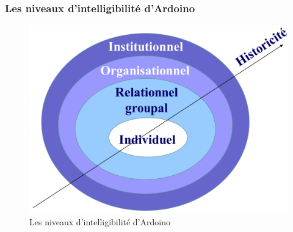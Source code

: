 \documentclass[12pt]{beamer}
\begin{document}
  \begin{frame}
     \frametitle{Les niveaux d'intelligibilité d'Ardoino}
     
     \begin{figure}[!ht]
	\begin{center}
	    \includegraphics[scale=0.27]{niveaux_intelligibilite_ardoino.png}
	    \caption{Les niveaux d'intelligibilité d'Ardoino}
	\end{center}
     \end{figure}
     
  \end{frame}
  
\end{document}
